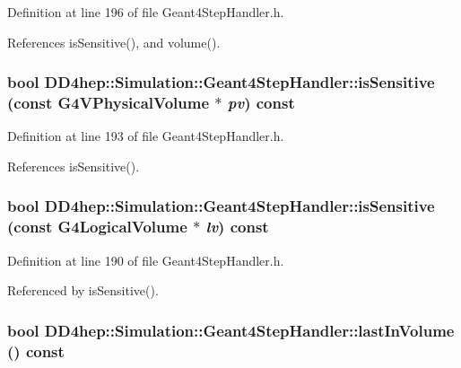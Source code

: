 Definition at line 196 of file Geant4StepHandler.h.

References isSensitive(), and volume().\hypertarget{class_d_d4hep_1_1_simulation_1_1_geant4_step_handler_afdd1be009c5f8aa81de959a8fc8c6f7d}{
\subsubsection[{isSensitive}]{\setlength{\rightskip}{0pt plus 5cm}bool DD4hep::Simulation::Geant4StepHandler::isSensitive (const G4VPhysicalVolume $\ast$ {\em pv}) const}}
\label{class_d_d4hep_1_1_simulation_1_1_geant4_step_handler_afdd1be009c5f8aa81de959a8fc8c6f7d}


Definition at line 193 of file Geant4StepHandler.h.

References isSensitive().\hypertarget{class_d_d4hep_1_1_simulation_1_1_geant4_step_handler_a180c0a67f1cc88eba63fbbcb4fe6f47d}{
\subsubsection[{isSensitive}]{\setlength{\rightskip}{0pt plus 5cm}bool DD4hep::Simulation::Geant4StepHandler::isSensitive (const G4LogicalVolume $\ast$ {\em lv}) const}}
\label{class_d_d4hep_1_1_simulation_1_1_geant4_step_handler_a180c0a67f1cc88eba63fbbcb4fe6f47d}


Definition at line 190 of file Geant4StepHandler.h.

Referenced by isSensitive().\hypertarget{class_d_d4hep_1_1_simulation_1_1_geant4_step_handler_accb8e37cbde988e9c4b2da379d28779e}{
\subsubsection[{lastInVolume}]{\setlength{\rightskip}{0pt plus 5cm}bool DD4hep::Simulation::Geant4StepHandler::lastInVolume () const}}
\label{class_d_d4hep_1_1_simulation_1_1_geant4_step_handler_accb8e37cbde988e9c4b2da379d28779e}


